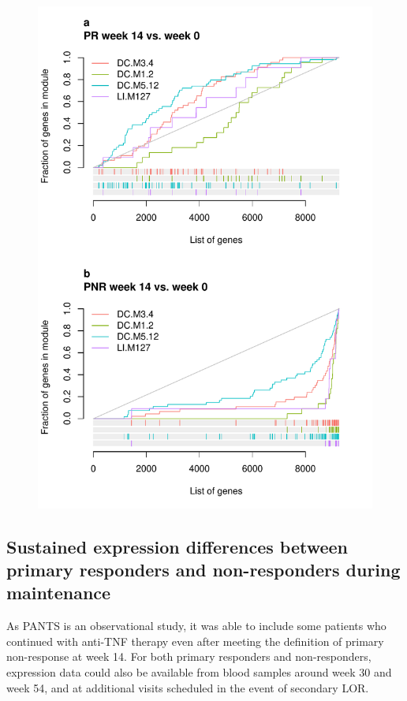 \begin{outline}
\begin{figure}
    \centering
    \includegraphics[width=1.0\textwidth,page=1]{mainmatter/figures/chapter_04/plot_gene_set_enrichment.evidencePlots_C_3_1_Interferon.pdf}
    \caption{}
    \label{fig:multipants_dge_evidencePlots_C_3_1_Interferon}
\end{figure}

\subsection{Sustained expression differences between primary responders and non-responders during maintenance}

As \gls{PANTS} is an observational study, it was able to include some patients who continued with anti-\gls{TNF} therapy
even after meeting the definition of primary non-response at week 14.
For both primary responders and non-responders, expression data could also be available from blood samples around week 30 and week 54, and at additional visits scheduled in the event of secondary LOR.


\end{outline}
